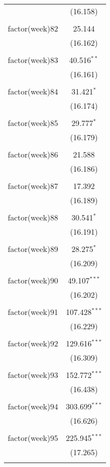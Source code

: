 \documentclass[twoside,twocolumn]{article}
\begin{document}
\begin{table}[!htbp]
\begin{tabular}{@{\extracolsep{5pt}}lc}
  & (16.158) \\ 
  & \\ 
 factor(week)82 & 25.144 \\ 
  & (16.162) \\ 
  & \\ 
 factor(week)83 & 40.516$^{**}$ \\ 
  & (16.161) \\ 
  & \\ 
 factor(week)84 & 31.421$^{*}$ \\ 
  & (16.174) \\ 
  & \\ 
 factor(week)85 & 29.777$^{*}$ \\ 
  & (16.179) \\ 
  & \\ 
 factor(week)86 & 21.588 \\ 
  & (16.186) \\ 
  & \\ 
 factor(week)87 & 17.392 \\ 
  & (16.189) \\ 
  & \\ 
 factor(week)88 & 30.541$^{*}$ \\ 
  & (16.191) \\ 
  & \\ 
 factor(week)89 & 28.275$^{*}$ \\ 
  & (16.209) \\ 
  & \\ 
 factor(week)90 & 49.107$^{***}$ \\ 
  & (16.202) \\ 
  & \\ 
 factor(week)91 & 107.428$^{***}$ \\ 
  & (16.229) \\ 
  & \\ 
 factor(week)92 & 129.616$^{***}$ \\ 
  & (16.309) \\ 
  & \\ 
 factor(week)93 & 152.772$^{***}$ \\ 
  & (16.438) \\ 
  & \\ 
 factor(week)94 & 303.699$^{***}$ \\ 
  & (16.626) \\ 
  & \\ 
 factor(week)95 & 225.945$^{***}$ \\ 
  & (17.265) \\ 
  & \\ 

\end{tabular}
\end{table}
\end{document}
